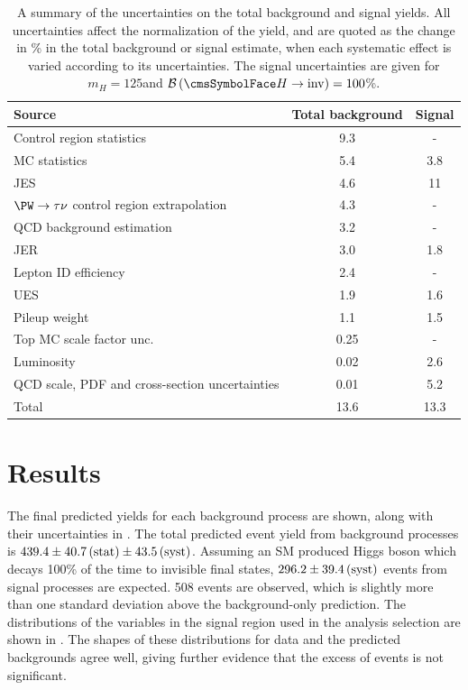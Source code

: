 \begin{table}
  \caption{A summary of the uncertainties on the total background and signal yields. All uncertainties affect the normalization of the yield, and are quoted as the change in \% in the total background or signal estimate, when each systematic effect is varied according to its uncertainties. The signal uncertainties are given for $m_{H}=125$\GeV and $\BRinv=100$\%.}
  \label{tab:parkedsyst}
  \begin{tabular}{lcc}
    \hline \hline
    Source  & Total background & Signal     \\
    \hline
    Control region statistics & 9.3 & - \\
    MC statistics & 5.4 & 3.8 \\
    \ac{JES} & 4.6 & 11 \\
    $\PW\rightarrow\tau\nu$ control region extrapolation & 4.3 & - \\
    QCD background estimation & 3.2 & - \\
    \ac{JER} & 3.0 & 1.8 \\
    Lepton ID efficiency & 2.4 & - \\
    \ac{UES} & 1.9 & 1.6 \\
    Pileup weight & 1.1 & 1.5 \\
    Top MC scale factor unc. & 0.25 & - \\
    Luminosity & 0.02 & 2.6 \\
    QCD scale, PDF and cross-section uncertainties & 0.01 & 5.2 \\
    \hline
    Total & 13.6 & 13.3 \\
    \hline \hline
  \end{tabular}
\end{table}




\section{Results}                                                                                                                                        
\label{sec:parkedresults}
The final predicted yields for each background process are shown, along with their uncertainties in . The total predicted event yield from background processes is $439.4\pm 40.7\,\text{(stat)}\pm 43.5 \,\text{(syst)}$. Assuming an \ac{SM} produced Higgs boson which decays 100\% of the time to invisible final states, $296.2\pm 39.4\,\text{(syst)}$ events from signal processes are expected. 508 events are observed, which is slightly more than one standard deviation above the background-only prediction. The distributions of the variables in the signal region used in the analysis selection are shown in . The shapes of these distributions for data and the predicted backgrounds agree well, giving further evidence that the excess of events is not significant.

